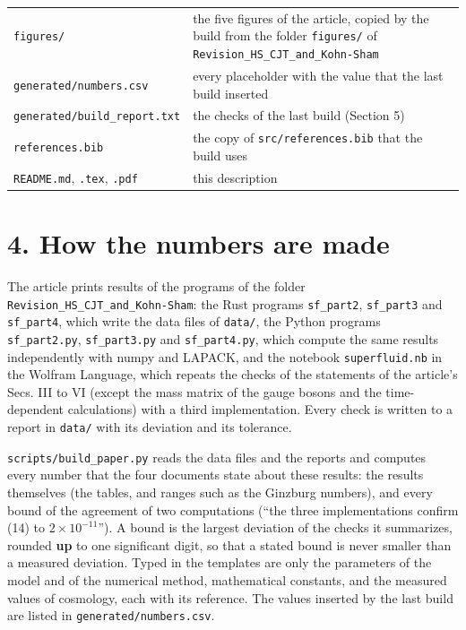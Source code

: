 \documentclass[
  10pt,
]{article}
\begin{document}
\begin{longtable}[]{@{}
  >{\raggedright\arraybackslash}p{}
  >{\raggedright\arraybackslash}p{}@{}}
\texttt{figures/} & the five figures of the article, copied by the build
from the folder \texttt{figures/} of
\texttt{Revision\_HS\_CJT\_and\_Kohn-Sham} \\
\texttt{generated/numbers.csv} & every placeholder with the value that
the last build inserted \\
\texttt{generated/build\_report.txt} & the checks of the last build
(Section 5) \\
\texttt{references.bib} & the copy of \texttt{src/references.bib} that
the build uses \\
\texttt{README.md}, \texttt{.tex}, \texttt{.pdf} & this description \\
\end{longtable}

\hypertarget{how-the-numbers-are-made}{%
\section{4. How the numbers are made}\label{how-the-numbers-are-made}}

The article prints results of the programs of the folder
\texttt{Revision\_HS\_CJT\_and\_Kohn-Sham}: the Rust programs
\texttt{sf\_part2}, \texttt{sf\_part3} and \texttt{sf\_part4}, which
write the data files of \texttt{data/}, the Python programs
\texttt{sf\_part2.py}, \texttt{sf\_part3.py} and \texttt{sf\_part4.py},
which compute the same results independently with numpy and LAPACK, and
the notebook \texttt{superfluid.nb} in the Wolfram Language, which
repeats the checks of the statements of the article's Secs. III to VI
(except the mass matrix of the gauge bosons and the time-dependent
calculations) with a third implementation. Every check is written to a
report in \texttt{data/} with its deviation and its tolerance.

\texttt{scripts/build\_paper.py} reads the data files and the reports
and computes every number that the four documents state about these
results: the results themselves (the tables, and ranges such as the
Ginzburg numbers), and every bound of the agreement of two computations
(``the three implementations confirm (14) to \(2\times10^{-11}\)''). A
bound is the largest deviation of the checks it summarizes, rounded
\textbf{up} to one significant digit, so that a stated bound is never
smaller than a measured deviation. Typed in the templates are only the
parameters of the model and of the numerical method, mathematical
constants, and the measured values of cosmology, each with its
reference. The values inserted by the last build are listed in
\texttt{generated/numbers.csv}.
\end{document}
